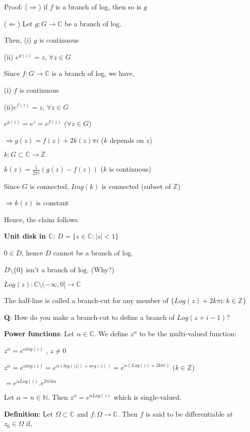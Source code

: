 \documentclass{article}
\begin{document}
\begin{flushleft}
Proof: ($\Rightarrow$) if $f$ is a branch of log, then so is $g$

($\Leftarrow$) Let $g:G\rightarrow \mathds{C}$ be a branch of log. 

Then, (i) $g$ is continuous

(ii) $e^{g(z)}=z$, $\forall z\in G$

Since $f:G\rightarrow \mathds{C}$ is a branch of log, we have, 

(i) $f$ is continuous 

(ii)$e^{f(z)}=z$, $\forall z\in G$

$e^{g(z)}=e^z=e^{f(z)}$ ($\forall z\in G$)

$\Rightarrow g(z)=f(z)+ 2k(z)\pi i$ ($k$ depends on $z$)

$k: G\subset \mathds{C}\rightarrow \mathds{Z}$

$k(z)=\frac{1}{2\pi i}(g(z)-f(z))$ ($k$ is continuous)

Since $G$ is connected, $Img(k)$ is connected  (subset of $\mathds{Z}$)

$\Rightarrow k(z)$ is constant 

Hence, the claim follows.

\textbf{Unit disk in $\mathds{C}$}: $D=\{z\in \mathds{C}: |z|< 1\}$

$0\in D$, hence $D$ cannot be a branch of log. 

$D\setminus \{0\}$ isn't a branch of log. (Why?)

$Log(z): \mathds{C}\setminus (-\infty,0]\rightarrow \mathds{C}$

The half-line is called a branch-cut for any member of $\{Log(z)+2k\pi i: k\in \mathds{Z}\}$

\textbf{Q}: How do you make a branch-cut to define a branch of $Log(z+i-1)$?

\textbf{Power functions}: Let $\alpha \in \mathds{C}$. We define $z^{\alpha}$ to be the multi-valued function:

$z^{\alpha}=e^{\alpha log(z)}$ , $z\neq 0$

$z^{\alpha}=e^{\alpha log(z)}= e^{\alpha(log(|z|)+ arg(z))}= e^{\alpha(Log(z)+2k\pi i)}$  ($k\in \mathds{Z}$) 

$=e^{\alpha Log(z)}.e^{2\pi ik\alpha}$ 

Let $\alpha=n \in \mathds{N}$. Then $z^{\alpha}=e^{nLog(z)}$ which is single-valued.

\textbf{Definition}: Let $\Omega \subset \mathds{C}$ and $f: \Omega \rightarrow \mathds{C}$. Then $f$ is said to be differentiable at $z_0\in \Omega$ if,


\end{flushleft}
\end{document}
